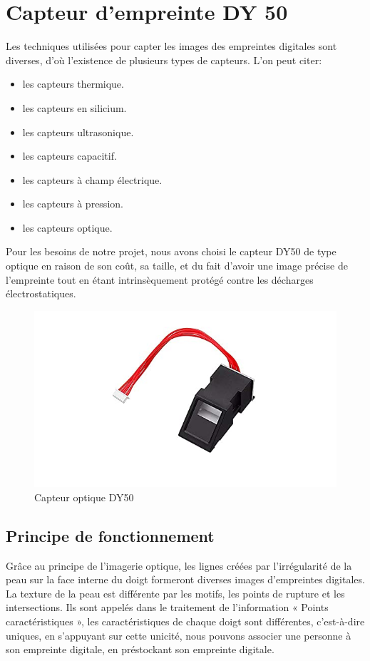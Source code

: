 \section{Capteur d'empreinte DY 50}
Les techniques utilisées pour capter les images des empreintes digitales sont 
diverses, d’où l’existence de plusieurs types de capteurs. L'on peut citer:

\begin{itemize}
    \item les capteurs thermique.
    \item les capteurs en silicium.
    \item les capteurs ultrasonique.
    \item les capteurs capacitif.
    \item les capteurs à champ électrique.
    \item les capteurs à pression.
    \item les capteurs optique.
\end{itemize}

Pour les besoins de notre projet, nous avons choisi le capteur DY50 de type
optique en raison de son coût, sa taille, et du fait d’avoir une image précise
de l’empreinte tout en étant intrinsèquement protégé contre les décharges
électrostatiques.

\begin{figure}[h!]
    \centering
    \includegraphics[scale=0.8]{images/dy50.jpg}
    \caption{Capteur optique DY50}
    \label{fig51}
\end{figure}

\subsection{Principe de fonctionnement}
Grâce au principe de l’imagerie optique, les lignes créées par l’irrégularité de 
la peau sur la face interne du doigt formeront diverses images d’empreintes 
digitales. La texture de la peau est différente par les motifs, les points de 
rupture et les intersections. Ils sont appelés dans le traitement de 
l’information « Points caractéristiques », les caractéristiques de chaque 
doigt sont différentes, c’est-à-dire uniques, en s’appuyant sur cette unicité, 
nous pouvons associer une personne à son empreinte digitale, en préstockant son 
empreinte digitale.

